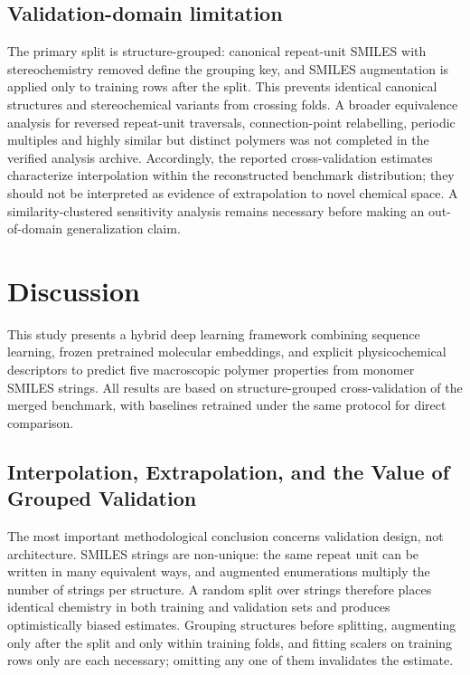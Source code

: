 \documentclass{article}
\begin{document}
\subsection{Validation-domain limitation}

The primary split is structure-grouped: canonical repeat-unit SMILES with stereochemistry removed define the grouping key, and SMILES augmentation is applied only to training rows after the split. This prevents identical canonical structures and stereochemical variants from crossing folds. A broader equivalence analysis for reversed repeat-unit traversals, connection-point relabelling, periodic multiples and highly similar but distinct polymers was not completed in the verified analysis archive. Accordingly, the reported cross-validation estimates characterize interpolation within the reconstructed benchmark distribution; they should not be interpreted as evidence of extrapolation to novel chemical space. A similarity-clustered sensitivity analysis remains necessary before making an out-of-domain generalization claim.

\section{Discussion}

This study presents a hybrid deep learning framework combining sequence learning, frozen pretrained molecular embeddings, and explicit physicochemical descriptors to predict five macroscopic polymer properties from monomer SMILES strings. All results are based on structure-grouped cross-validation of the merged benchmark, with baselines retrained under the same protocol for direct comparison.

\subsection{Interpolation, Extrapolation, and the Value of Grouped Validation}

The most important methodological conclusion concerns validation design, not architecture. SMILES strings are non-unique: the same repeat unit can be written in many equivalent ways, and augmented enumerations multiply the number of strings per structure. A random split over strings therefore places identical chemistry in both training and validation sets and produces optimistically biased estimates. Grouping structures before splitting, augmenting only after the split and only within training folds, and fitting scalers on training rows only are each necessary; omitting any one of them invalidates the estimate.
\end{document}
